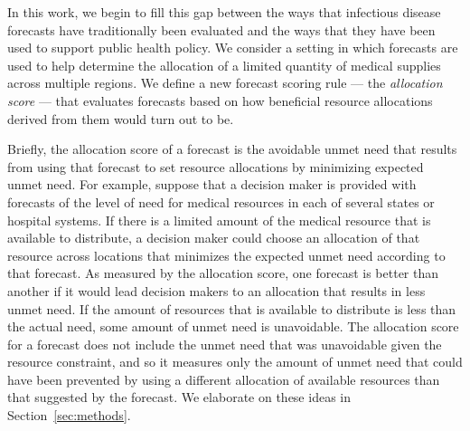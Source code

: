 \documentclass{article}
\begin{document}
In this work, we begin to fill this gap between the ways that infectious disease forecasts have traditionally been evaluated and the ways that they have been used to support public health policy.
We consider a setting in which forecasts are used to help determine the allocation of a limited quantity of medical supplies across multiple regions.
We define a new forecast scoring rule --- the {\em allocation score} --- that evaluates forecasts based on how beneficial resource allocations derived from them would turn out to be.

Briefly, the allocation score of a forecast is the avoidable unmet need that results from using that forecast to set resource allocations by minimizing expected unmet need.
For example, suppose that a decision maker is provided with forecasts of the level of need for medical resources in each of several states or hospital systems.
If there is a limited amount of the medical resource that is available to distribute, a decision maker could choose an allocation of that resource across locations that minimizes the expected unmet need according to that forecast.
As measured by the allocation score, one forecast is better than another if it would lead decision makers to an allocation that results in less unmet need.
If the amount of resources that is available to distribute is less than the actual need, some amount of unmet need is unavoidable.
The allocation score for a forecast does not include the unmet need that was unavoidable given the resource constraint, and so it measures only the amount of unmet need that could have been prevented by using a different allocation of available resources than that suggested by the forecast.
We elaborate on these ideas in Section~\ref{sec:methods}.
\end{document}

